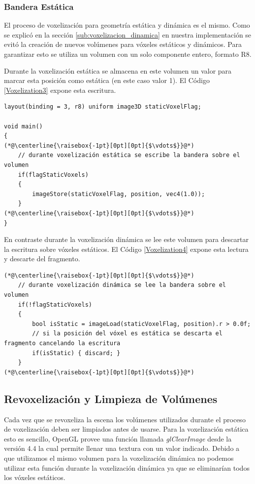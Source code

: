 \subsubsection{Bandera Estática}
El proceso de voxelización para geometría estática y dinámica es el mismo. Como se explicó en la sección \ref{sub:voxelizacion_dinamica} en nuestra implementación se evitó la creación de nuevos volúmenes para vóxeles estáticos y dinámicos. Para garantizar esto se utiliza un volumen con un solo componente entero, formato R8.

Durante la voxelización estática se almacena en este volumen un valor para marcar esta posición como estática (en este caso valor 1). El Código \ref{Voxelization3} expone esta escritura. 
\\
\begin{lstlisting}[caption={Escritura de la bandera estática durante voxelización de geometría estática}, label=Voxelization3]
layout(binding = 3, r8) uniform image3D staticVoxelFlag;

void main()
{
(*@\centerline{\raisebox{-1pt}[0pt][0pt]{$\vdots$}}@*)
    // durante voxelización estática se escribe la bandera sobre el volumen
    if(flagStaticVoxels)
    {
        imageStore(staticVoxelFlag, position, vec4(1.0));
    }
(*@\centerline{\raisebox{-1pt}[0pt][0pt]{$\vdots$}}@*)
}
\end{lstlisting}

En contraste durante la voxelización dinámica se lee este volumen para descartar la escritura sobre vóxeles estáticos. El Código \ref{Voxelization4} expone esta lectura y descarte del fragmento.
\\
\begin{lstlisting}[caption={Lectura de la bandera estática durante voxelización de geometría dinámica.}, label=Voxelization4]
(*@\centerline{\raisebox{-1pt}[0pt][0pt]{$\vdots$}}@*)
    // durante voxelización dinámica se lee la bandera sobre el volumen
    if(!flagStaticVoxels)
    {
        bool isStatic = imageLoad(staticVoxelFlag, position).r > 0.0f;
        // si la posición del vóxel es estática se descarta el fragmento cancelando la escritura
        if(isStatic) { discard; }
    }
(*@\centerline{\raisebox{-1pt}[0pt][0pt]{$\vdots$}}@*)
\end{lstlisting}

\subsection{Revoxelización y Limpieza de Volúmenes}
Cada vez que se revoxeliza la escena los volúmenes utilizados durante el proceso de voxelización deben ser limpiados antes de usarse. Para la voxelización estática esto es sencillo, OpenGL provee una función llamada \emph{glClearImage} desde la versión 4.4 la cual permite llenar una textura con un valor indicado. Debido a que utilizamos el mismo volumen para la voxelización dinámica no podemos utilizar esta función durante la voxelización dinámica ya que se eliminarían todos los vóxeles estáticos.

